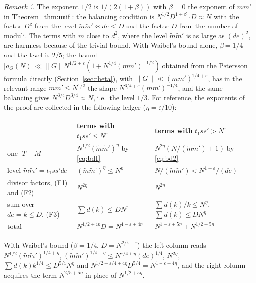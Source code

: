 \documentclass[11pt]{amsart}
\theoremstyle{remark}
\newtheorem{remark}[theorem]{Remark}
\newcommand{\e}{\varepsilon}
\begin{document}
\begin{remark}\label{rem:bookkeeping}
The exponent $1/2$ is $1/(2(1+\beta))$ with $\beta=0$ the exponent of $mm'$ in Theorem~\ref{thm:unif}: the balancing condition is $N^{1/2}D^{1+\beta}\cdot D\approx N$ with the factor $D^{\beta}$ from the level $\tilde m\tilde m'\approx de\le D$ and the factor $D$ from the number of moduli. The terms with $m$ close to $d^2$, where the level $\tilde m\tilde m'$ is as large as $(de)^2$, are harmless because of the trivial bound. With Waibel's bound alone, $\beta=1/4$ and the level is $2/5$; the bound $|a_G(N)|\ll\|G\|N^{1/2+\e}(1+N^{1/4}(mm')^{-1/2})$ obtained from the Petersson formula directly (Section~\ref{sec:theta}), with $\|G\|\ll(mm')^{1/4+\e}$, has in the relevant range $mm'\le N^{1/2}$ the shape $N^{3/4+\e}(mm')^{-1/4}$, and the same balancing gives $N^{3/4}D^{3/4}\approx N$, i.e.\ the level $1/3$. For reference, the exponents of the proof are collected in the following ledger ($\eta=\e/10$):
\begin{center}\small
\begin{tabular}{lll}
\hline
 & terms with $t_1ss'\le N^\e$ & terms with $t_1ss'>N^\e$\\
\hline
one $|T-M|$ & $N^{1/2}(\tilde m\tilde m')^{\eta}$ by \eqref{eq:bd1} & $N^{2\eta}(N/(\tilde m\tilde m')+1)$ by \eqref{eq:bd2}\\
level $\tilde m\tilde m'=t_1ss'de$ & $(\tilde m\tilde m')^{\eta}\le N^{\eta}$ & $N/(\tilde m\tilde m')<N^{1-\e}/(de)$\\
divisor factors, (F1) and (F2) & $N^{2\eta}$ & $N^{2\eta}$\\
sum over $de=k\le D$, (F3) & $\sum d(k)\le DN^\eta$ & $\sum d(k)/k\le N^\eta$, $\sum d(k)\le DN^\eta$\\
total & $N^{1/2+4\eta}D=N^{1-\e+4\eta}$ & $N^{1-\e+5\eta}+N^{1/2+5\eta}$\\
\hline
\end{tabular}
\end{center}
{\sloppy With Waibel's bound ($\beta=1/4$, $D=N^{2/5-\e}$) the left column reads $N^{1/2}(\tilde m\tilde m')^{1/4+\eta}$, $(\tilde m\tilde m')^{1/4+\eta}\le N^{\e/4+\eta}(de)^{1/4}$, $N^{2\eta}$, $\sum d(k)k^{1/4}\le D^{5/4}N^\eta$ and $N^{1/2+\e/4+4\eta}D^{5/4}=N^{1-\e+4\eta}$, and the right column acquires the term $N^{2/5+5\eta}$ in place of $N^{1/2+5\eta}$.\par}
\end{remark}

\end{document}
